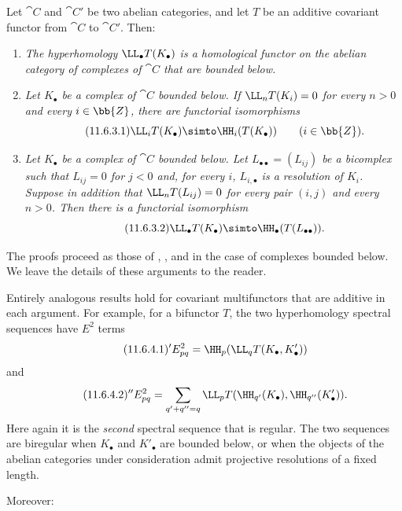 \begin{proposition}[11.6.3]
\label{0.11.6.3}
Let $\cat{C}$ and $\cat{C}'$ be two abelian categories, and let $T$ be an additive covariant functor from $\cat{C}$ to $\cat{C}'$.
Then:
\begin{enumerate}
  \item[{\rm(i)}] \emph{The hyperhomology $\LL_\bullet T(K_\bullet)$ is a homological functor on the abelian category of complexes of $\cat{C}$ that are bounded below.}

  \item[{\rm(ii)}] \emph{Let $K_\bullet$ be a complex of $\cat{C}$ bounded below.
  If $\LL_nT(K_i)=0$ for every $n>0$ and every $i\in\bb{Z}$, there are functorial isomorphisms}
  \[
  \label{0.11.6.3.1}
  \tag{11.6.3.1}
    \LL_iT(K_\bullet)
    \simto
    \HH_i(T(K_\bullet))
    \qquad(i\in\bb{Z}).
  \]

  \item[{\rm(iii)}] \emph{Let $K_\bullet$ be a complex of $\cat{C}$ bounded below.
  Let $L_{\bullet\bullet}=(L_{ij})$ be a bicomplex such that $L_{ij}=0$ for $j<0$ and, for every $i$, $L_{i,\bullet}$ is a resolution of $K_i$.
  Suppose in addition that $\LL_nT(L_{ij})=0$ for every pair $(i,j)$ and every $n>0$.
  Then there is a functorial isomorphism}
  \[
  \label{0.11.6.3.2}
  \tag{11.6.3.2}
    \LL_\bullet T(K_\bullet)
    \simto
    \HH_\bullet(T(L_{\bullet\bullet})).
  \]
\end{enumerate}

The proofs proceed as those of , , and  in the case of complexes bounded below.
We leave the details of these arguments to the reader.
\end{proposition}

\begin{env}[11.6.4]
\label{0.11.6.4}
Entirely analogous results hold for covariant multifunctors that are additive in each argument.
For example, for a bifunctor $T$, the two hyperhomology spectral sequences have $E^2$ terms
\[
\label{0.11.6.4.1}
\tag{11.6.4.1}
  {}'E^2_{pq}
  =\HH_p(\LL_qT(K_\bullet,K'_\bullet))
\]
and
\[
\label{0.11.6.4.2}
\tag{11.6.4.2}
  {}''E^2_{pq}
  =
  \sum_{q'+q''=q}
  \LL_pT(\HH_{q'}(K_\bullet),\HH_{q''}(K'_\bullet)).
\]
Here again it is the \emph{second} spectral sequence that is regular.
The two sequences are biregular when $K_\bullet$ and $K'_\bullet$ are bounded below, or when the objects of the abelian categories under consideration admit projective resolutions of a fixed length.

Moreover:
\end{env}

